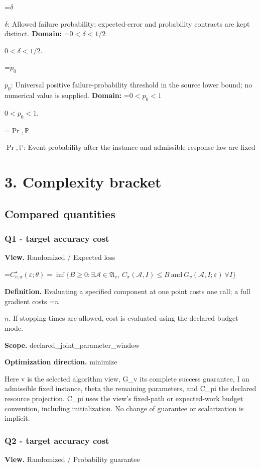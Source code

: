 \documentclass[10pt,a4paper]{article}
\newcommand{\AtlasMath}[1]{\par\begingroup\centering\setbox0=\hbox{$\displaystyle #1$}\ifdim\wd0>1.4\linewidth\typeout{ATLAS WIDE FORMULA: \the\wd0}\fi\ifdim\wd0>\linewidth\resizebox{\linewidth}{!}{\box0}\else\box0\fi\par\endgroup}
\newcommand{\AtlasInlineMath}[1]{\begingroup\setbox0=\hbox{$#1$}\ifdim\wd0>.4\linewidth\endgroup\AtlasMath{#1}\else\endgroup$#1$\fi}
\begin{document}
\AtlasInlineMath{\delta}: Allowed failure probability; expected-error and probability contracts are kept distinct. \textbf{Domain:} \AtlasInlineMath{0<\delta<1/2}.

\AtlasInlineMath{p_0}: Universal positive failure-probability threshold in the source lower bound; no numerical value is supplied. \textbf{Domain:} \AtlasInlineMath{0<p_0<1}.

\AtlasInlineMath{\Pr,\mathbb{P}}: Event probability after the instance and admissible response law are fixed

\section{3. Complexity bracket}
\subsection{Compared quantities}
\subsubsection{Q1 - target accuracy cost}
\textbf{View.} Randomized / Expected loss

\AtlasMath{C^\star_{v,\pi}(\varepsilon;\theta)=\inf\{B\ge0:\exists\mathcal A\in\mathfrak A_v,\ C_\pi(\mathcal A,I)\le B\ \text{and}\ G_v(\mathcal A,I;\varepsilon)\ \forall I\}}
\textbf{Definition.} Evaluating a specified component at one point costs one call; a full gradient costs \AtlasInlineMath{n}. If stopping times are allowed, cost is evaluated using the declared budget mode.

\textbf{Scope.} declared\_joint\_parameter\_window

\textbf{Optimization direction.} minimize

Here v is the selected algorithm view, G\_v its complete success guarantee, I an admissible fixed instance, theta the remaining parameters, and C\_pi the declared resource projection. C\_pi uses the view's fixed-path or expected-work budget convention, including initialization. No change of guarantee or scalarization is implicit.

\subsubsection{Q2 - target accuracy cost}
\textbf{View.} Randomized / Probability guarantee
\end{document}
